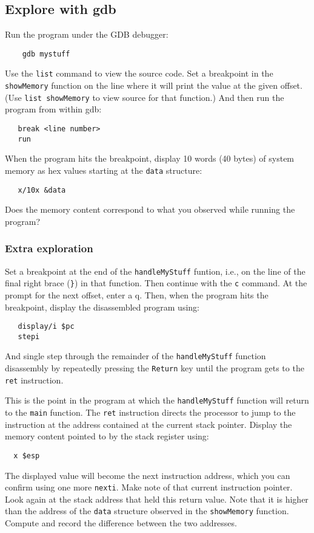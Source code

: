 \subsection{Explore with gdb}
Run the program under the GDB debugger:
\begin{verbatim}
    gdb mystuff
\end{verbatim}
\noindent Use the {\tt list} command to view the source code.  Set a breakpoint in the {\tt showMemory} 
function on the line where it will print the value at the given offset. (Use {\tt list showMemory} to view
source for that function.)  And then run the program from within
gdb:
\begin{verbatim}
   break <line number>
   run
\end{verbatim}
\noindent When the program hits the breakpoint, display 10 words (40 bytes) of system memory as hex
values starting at the {\tt data} structure:
\begin{verbatim}
   x/10x &data
\end{verbatim}
Does the memory content correspond to what you observed while running the program?

\subsubsection{Extra exploration}
Set a breakpoint at the end of the {\tt handleMyStuff} funtion, i.e., on the line of the final right brace
({\tt\}}) in that function.  Then continue with the {\tt c} command.  At the prompt for the next offset,
enter a q.  Then, when the program hits the breakpoint, display the disassembled program using:
\begin{verbatim}
   display/i $pc
   stepi
\end{verbatim}
\noindent And single step through the remainder of the {\tt handleMyStuff} function disassembly by
repeatedly pressing the {\tt Return} key until the program gets to the {\tt ret} instruction.

This is the point in the program at which the {\tt handleMyStuff} function will return to the {\tt main}
function.  The {\tt ret} instruction directs the processor to jump to the instruction at the address
contained at the current stack pointer.  Display the memory content pointed to by the stack register using:
\begin{verbatim}
  x $esp
\end{verbatim}
\noindent  The displayed value will become the next instruction address, which you can confirm using one
more {\tt nexti}.   Make note of that current instruction pointer.  
Look again at the stack address that held this return value.  Note that it is higher
than the address of the {\tt data} structure observed in the {\tt showMemory} function.  Compute 
and record the difference between the two addresses.

